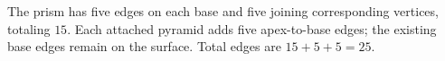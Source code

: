 The prism has five edges on each base and five joining corresponding vertices, totaling $15$. Each attached pyramid adds five apex-to-base edges; the existing base edges remain on the surface. Total edges are $15+5+5=\boxed{25}$.
